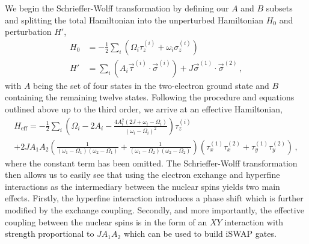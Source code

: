 We begin the Schrieffer-Wolff transformation by defining our $A$ and $B$ subsets and splitting the total Hamiltonian into the unperturbed Hamiltonian $H_0$ and perturbation $H'$,
\begin{align}
    H_0 & = -\frac{1}{2}\sum_i \left(\Omega_i \tau_{z}^{(i)} + \omega_i \sigma_z^{(i)} \right)                                   \\
    H'  & = \sum_i \left( A_i \vec{\tau}^{(i)}\cdot \vec{\sigma}^{(i)}\right) + J\vec{\sigma}^{(1)}\cdot\vec{\sigma}^{(2)}   \,,
\end{align}
with $A$ being the set of four states in the two-electron ground state and $B$ containing the remaining twelve states.
Following the procedure and equations outlined above up to the third order, we arrive at an effective Hamiltonian,
\begin{multline}
    H_\textrm{eff}= -\frac{1}{2}\sum_i \left( \Omega_i -2 A_i - \frac{4A_i^2(2J+\omega_i-\Omega_i)}{(\omega_i-\Omega_i)^2} \right)\tau_z^{(i)} \\ + 2JA_1A_2\left( \frac{1}{(\omega_1-\Omega_1)(\omega_2-\Omega_1)} + \frac{1}{(\omega_1-\Omega_2)(\omega_2-\Omega_2)}\right)(\tau_x^{(1)}\tau_x^{(2)}+\tau_y^{(1)}\tau_y^{(2)}) \,,
\end{multline}
where the constant term has been omitted.
The Schrieffer-Wolff transformation then allows us to easily see that using the electron exchange and hyperfine interactions as the intermediary between the nuclear spins yields two main effects.
Firstly, the hyperfine interaction introduces a phase shift which is further modified by the exchange coupling.
Secondly, and more importantly, the effective coupling between the nuclear spins is in the form of an $XY$ interaction with strength proportional to $JA_1A_2$ which can be used to build iSWAP gates.